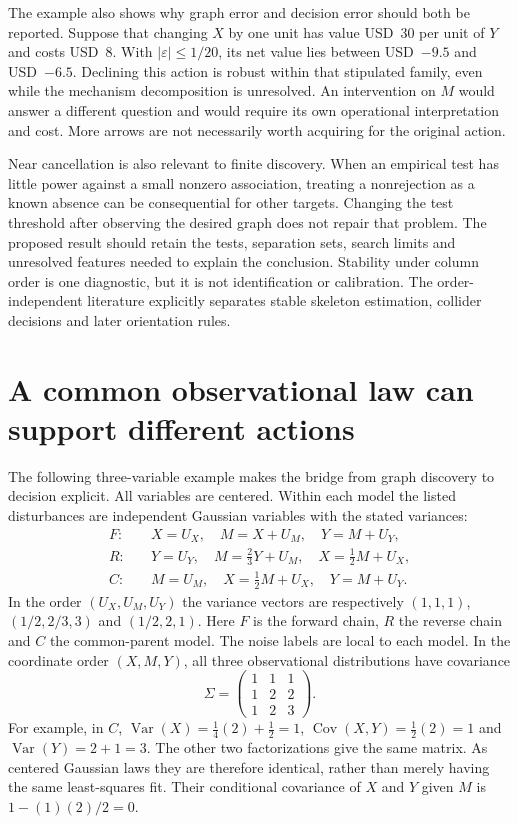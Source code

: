The example also shows why graph error and decision error should both be
reported. Suppose that changing $X$ by one unit has value USD~30 per unit of
$Y$ and costs USD~8. With $|\varepsilon|\leq 1/20$, its net value lies between
USD~$-9.5$ and USD~$-6.5$. Declining this action is robust within that
stipulated family, even while the mechanism decomposition is unresolved.
An intervention on $M$ would answer a different question and would require
its own operational interpretation and cost. More arrows are not necessarily
worth acquiring for the original action. \citep{exec16_s2_exact}

Near cancellation is also relevant to finite discovery. When an empirical
test has little power against a small nonzero association, treating a
nonrejection as a known absence can be consequential for other targets.
Changing the test threshold after observing the desired graph does not repair
that problem. The proposed result should retain the tests, separation sets,
search limits and unresolved features needed to explain the conclusion.
Stability under column order is one diagnostic, but it is not identification
or calibration. The order-independent literature explicitly separates stable
skeleton estimation, collider decisions and later orientation rules.
\citep{exec13_latentr_colombo2014,exec13_pydisc_causallearn}

\section{A common observational law can support different actions}

The following three-variable example makes the bridge from graph discovery to
decision explicit. All variables are centered. Within each model the listed
disturbances are independent Gaussian variables with the stated variances:
\begin{align*}
 F:\quad &X=U_X,\quad M=X+U_M,\quad Y=M+U_Y,\\
 R:\quad &Y=U_Y,\quad M=\tfrac23Y+U_M,\quad X=\tfrac12M+U_X,\\
 C:\quad &M=U_M,\quad X=\tfrac12M+U_X,\quad Y=M+U_Y.
\end{align*}
In the order $(U_X,U_M,U_Y)$ the variance vectors are respectively
$(1,1,1)$, $(1/2,2/3,3)$ and $(1/2,2,1)$.
Here $F$ is the forward chain, $R$ the reverse chain and $C$ the common-parent
model. The noise labels are local to each model. In the coordinate order
$(X,M,Y)$, all three observational distributions have covariance
\[
 \Sigma=\begin{pmatrix}1&1&1\\1&2&2\\1&2&3\end{pmatrix}.
\]
For example, in $C$, $\operatorname{Var}(X)=\tfrac14(2)+\tfrac12=1$,
$\operatorname{Cov}(X,Y)=\tfrac12(2)=1$ and
$\operatorname{Var}(Y)=2+1=3$. The other two factorizations give the same
matrix. As centered Gaussian laws they are therefore identical, rather than
merely having the same least-squares fit. Their conditional covariance of
$X$ and $Y$ given $M$ is $1-(1)(2)/2=0$.
\citep{exec16_s2_exact}

